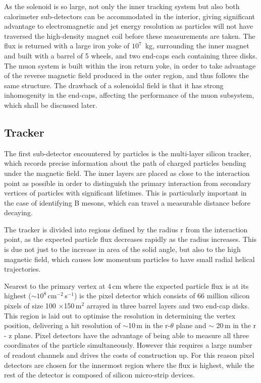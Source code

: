 As the solenoid is so large, not only the inner tracking system but also both calorimeter sub-detectors can be accommodated in the interior, giving significant advantage to electromagnetic and jet energy resolution as particles will not have traversed the high-density magnet coil before these measurements are taken. The flux is returned with a large iron yoke of $10^{7}$~kg, surrounding the inner magnet and built with a barrel of 5 wheels, and two end-caps each containing three disks. The muon system is built within the iron return yoke, in order to take advantage of the reverse magnetic field produced in the outer region, and thus follows the same structure. The drawback of a solenoidal field is that it has strong inhomogenity in the end-caps, affecting the performance of the muon subsystem, which shall be discussed later.


\subsection{Tracker}



The first sub-detector encountered by particles is the multi-layer silicon tracker, which records precise information about the path of charged particles bending under the magnetic field. The inner layers are placed as close to the interaction point as possible in order to distinguish the primary interaction from secondary vertices of particles with significant lifetimes. This is particularly important in the case of identifying B mesons, which can travel a measurable distance before decaying.  

The tracker is divided into regions defined by the radius r from the interaction point, as the expected particle flux decreases rapidly as the radius increases. This is due not just to the increase in area of the solid angle, but also to the high magnetic field, which causes low momentum particles to have small radial helical trajectories.

Nearest to the primary vertex at 4\,cm where the expected particle flux is at its highest ($\sim10^{8}$\,cm$^{-2}$\,s$^{-1}$) is the pixel detector which consists of 66 million silicon pixels of size 100 $\times$150\,\textmu m$^{2}$ arrayed in three barrel layers and two end-cap disks. This region is laid out to optimise the resolution in determining the vertex position, delivering a hit resolution of $\sim$10\,\textmu m in the r-$\theta$ plane and $\sim$ 20\,\textmu m in the r - z plane. Pixel detectors have the advantage of being able to measure all three coordinates of the particle simultaneously. However this requires a large number of readout channels and drives the costs of construction up. For this reason pixel detectors are chosen for the innermost region where the flux is highest, while the rest of the detector is composed of silicon micro-strip devices. 

